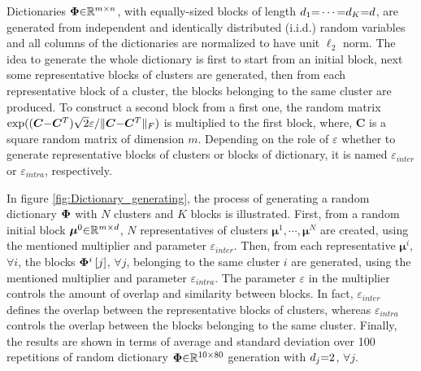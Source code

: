 Dictionaries $\boldsymbol{\Phi} {\in} \mathbb{R}^{m {\times} n}$, with equally-sized blocks of length $d_1 {=} \cdots {=} d_K {=} d$, are generated from independent and identically distributed (i.i.d.) random variables and all columns of the dictionaries are normalized to have unit $\ell_2$ norm.
The idea to generate the whole dictionary is first to start from an initial block, next some representative blocks of clusters are generated, then from each representative block of a cluster, the blocks belonging to the same cluster are produced.
To construct a second block from a first one, the random matrix $\exp((\boldsymbol{C} {-} \boldsymbol{C}^T) \sqrt{2} \varepsilon / \Vert \boldsymbol{C} {-} \boldsymbol{C}^T \Vert_F)$ is multiplied to the first block, where, $\boldsymbol{C}$ is a square random matrix of dimension $m$.
Depending on the role of $\varepsilon$ whether to generate representative blocks of clusters or blocks of dictionary, it is named $\varepsilon_{inter}$ or $\varepsilon_{intra}$, respectively.

In figure \ref{fig:Dictionary_generating}, the process of generating a random dictionary $\boldsymbol{\Phi}$ with $N$ clusters and $K$ blocks is illustrated.
First, from a random initial block $\boldsymbol{\mu}^0 {\in} \mathbb{R}^{m {\times} d}$, $N$ representatives of clusters $\boldsymbol{\mu}^1 , \cdots , \boldsymbol{\mu}^N$ are created, using the mentioned multiplier and parameter $\varepsilon_{inter}$.
Then, from each representative $\boldsymbol{\mu}^i$, $\forall i$, the blocks $\boldsymbol{\Phi}^i\left[ j \right]$, $\forall j$, belonging to the same cluster $i$ are generated, using the mentioned multiplier and parameter $\varepsilon_{intra}$.
The parameter $\varepsilon$ in the multiplier controls the amount of overlap and similarity between blocks.
In fact, $\varepsilon_{inter}$ defines the overlap between the representative blocks of clusters, whereas $\varepsilon_{intra}$ controls the overlap between the blocks belonging to the same cluster.
Finally, the results are shown in terms of average and standard deviation over 100 repetitions of random dictionary $\boldsymbol{\Phi} {\in} \mathbb{R}^{10 {\times} 80}$ generation with $d_j {=} 2$, $\forall j$.

\FloatBarrier
